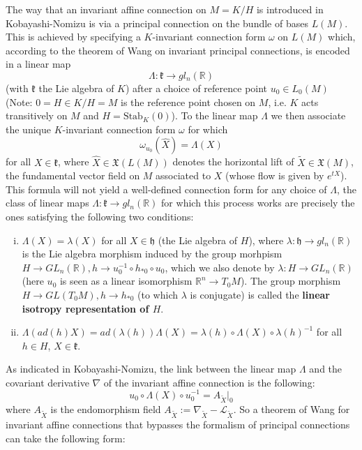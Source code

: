 \documentclass[a4paper,12pt,parskip=half*,chapterprefix=true,numbers=noendperiod]{scrreprt}
\theoremstyle{definition}
\theoremstyle{remark}
\begin{document}
The way that an invariant affine connection on $M=K/H$ is introduced in Kobayashi-Nomizu is via a principal connection on the bundle of bases $L(M)$. This is achieved by specifying a $K$-invariant connection form $\omega$ on $L(M)$ which, according to the theorem of Wang on invariant principal connections, is encoded in a linear map
\begin{equation*}
	\Lambda:\mathfrak{k}\to gl_n(\mathbb{R})
\end{equation*}
(with $\mathfrak{k}$ the Lie algebra of $K$) after a choice of reference point $u_0\in L_0(M)$ (Note: $0=H\in K/H=M$ is the reference point chosen on $M$, i.e. $K$ acts transitively on $M$ and $H=\text{Stab}_K(0)$). To the linear map $\Lambda$ we then associate the unique $K$-invariant connection form $\omega$ for which
\begin{equation*}
	\omega_{u_0}(\hat{X})=\Lambda(X)
\end{equation*}
for all $X\in\mathfrak{k}$, where $\hat{X}\in\mathfrak{X}(L(M))$ denotes the horizontal lift of $\tilde{X}\in\mathfrak{X}(M)$, the fundamental vector field on $M$ associated to $X$ (whose flow is given by $e^{tX}$). This formula will not yield a well-defined connection form for any choice of $\Lambda$, the class of linear maps $\Lambda:\mathfrak{k}\to gl_n(\mathbb{R})$ for which this process works are precisely the ones satisfying the following two conditions:
\begin{enumerate}[(i)]
	\item $\Lambda(X)=\lambda(X)$ for all $X\in\mathfrak{h}$ (the Lie algebra of $H$), where $\lambda:\mathfrak{h}\to gl_n(\mathbb{R})$ is the Lie algebra morphism induced by the group morhpism $H\to GL_n(\mathbb{R}),h\to u^{-1}_0\circ h_{*0}\circ u_0$, which we also denote by $\lambda:H\to GL_n(\mathbb{R})$ (here $u_0$ is seen as a linear isomorphism $\mathbb{R}^n\to T_0M$). The group morphism $H\to GL(T_0M),h\to h_{*0}$ (to which $\lambda$ is conjugate) is called the \textbf{linear isotropy representation of $H$}.
	\item $\Lambda(ad(h)X)=ad(\lambda(h))\Lambda(X)=\lambda(h)\circ\Lambda(X)\circ\lambda(h)^{-1}$  for all $h\in H$, $X\in\mathfrak{k}$.
\end{enumerate}

As indicated in Kobayashi-Nomizu, the link between the linear map $\Lambda$ and the covariant derivative $\nabla$ of the invariant affine connection is the following:
\begin{equation*}
	u_0\circ\Lambda(X)\circ u^{-1}_0=A_{\tilde{X}}|_0
\end{equation*}
where $A_{\tilde{X}}$ is the endomorphism field $A_{\tilde{X}}:=\nabla_{\tilde{X}}-\mathcal{L}_{\tilde{X}}$. So a theorem of Wang for invariant affine connections that bypasses the formalism of principal connections can take the following form:
\end{document}
